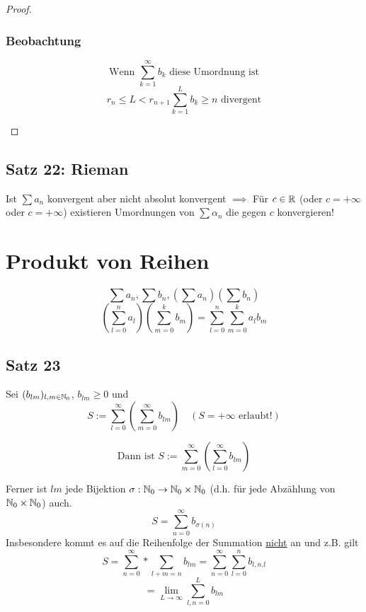 \begin{proof}
\begin{enumerate}[1)]
\subsubsection{Beobachtung}

\[\text{Wenn } \sum_{k=1}^\infty b_k \text{ diese Umordnung ist}\]
\[r_n \leq L < r_{n+1} \boxed{\sum_{k=1}^L b_k \geq n} \text{ divergent}\]
  
\end{enumerate}
\end{proof}

\pagebreak 



\subsection{Satz 22: Rieman}

Ist $\sum a_n$ konvergent aber nicht absolut konvergent $\implies$ Für $c \in \mathbb{R}$ (oder $c=+\infty$ oder $c=+\infty$) existieren Umordnungen von $\sum \alpha_n$ die gegen $c$ konvergieren!

\section{Produkt von Reihen}

\[\sum a_n, \sum b_n, \left( \sum a_n \right) \left( \sum b_n \right)\]
\[\left( \sum_{l=0}^n a_l \right) \left( \sum_{m=0}^k b_m \right) = \sum_{l=0}^n \sum_{m=0}^k a_l b_m \]


\subsection{Satz 23}

Sei $(b_{lm})_{l,m \in \mathbb{N}_0}$, $b_{lm} \geq 0$ und
\[S:= \sum_{l=0}^\infty \left( \sum_{m=0}^\infty b_{lm} \right) \quad (S= + \infty \text{ erlaubt!})\]


\[\text{Dann ist } S:= \sum_{m=0}^\infty \left( \sum_{l=0}^\infty b_{lm} \right)\]

Ferner ist $lm$ jede Bijektion $\sigma: \mathbb{N}_0 \to \mathbb{N}_0 \times \mathbb{N}_0$ (d.h. für jede Abzählung von $\mathbb{N}_0 \times \mathbb{N}_0$) auch.
\[S= \sum_{n=0}^\infty b_{\sigma(n)}\]
Insbesondere kommt es auf die Reihenfolge der Summation \underline{nicht} an und z.B. gilt
\[S=\sum_{n=0}^\infty * \sum_{l+m=n} b_{lm} = \sum_{n=0}^\infty \sum_{l=0}^n b_{l,n.l}\]
\[= \lim_{L\to \infty} \sum_{l,n=0}^L b_{lm}\]

